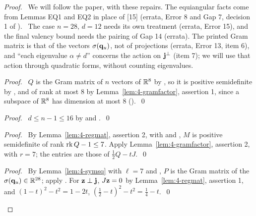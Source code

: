 \begin{proof}
 \pfsketch\ We will follow the paper, with these repairs. The equiangular facts come from
 Lemmas EQ1 and EQ2 in place of [15] (errata, Error 8 and Gap 7, decision 1 of
 ). \repair\ The case $n=28$, $d=12$ needs its own treatment (errata,
 Error 15), and the final valency bound needs the pairing of Gap 14 (errata). The printed Gram
 matrix is that of the vectors $\sigma({\mathbf q}_u)$, not of projections (errata, Error 13, item 6), and
 ``each eigenvalue $\alpha\ne d$'' concerns the action on ${\mathbf j}^\perp$ (item 7); we will use that
 action through quadratic forms, without counting eigenvalues.
 \begin{proof}\pf\ $Q$ is the Gram matrix of $n$ vectors of
  ${\mathbb R}^8$ by , so it is positive semidefinite by , and of rank
  at most 8 by Lemma~\ref{lem:4-gramfactor}, assertion 1, since a subspace of ${\mathbb R}^8$ has
  dimension at most 8 ().~\qed\end{proof}
 \begin{proof}\pf\ $d\le n-1\le16$ by  and .~\qed\end{proof}
 \begin{proof}\pf\ By Lemma~\ref{lem:4-regmat}, assertion 2, with  and
  , $M$ is positive semidefinite of rank $\mathop{\mathrm{rk}}\nolimits Q-1\le7$. Apply
  Lemma~\ref{lem:4-gramfactor}, assertion 2, with $r=7$; the entries are those of
  $\frac12Q-tJ$.~\qed\end{proof}
 \begin{proof}\pf\ By Lemma~\ref{lem:4-symsq} with $\ell=7$ and , $P$ is the Gram
  matrix of the $\sigma({\mathbf q}_u)\in{\mathbb R}^{28}$; apply . For
  ${\mathbf z}\perp{\mathbf j}$, $J{\mathbf z}=0$ by Lemma~\ref{lem:4-regmat}, assertion 1, and $(1-t)^2-t^2=1-2t$,
  $(\frac12-t)^2-t^2=\frac14-t$.~\qed\end{proof}

\end{proof}
